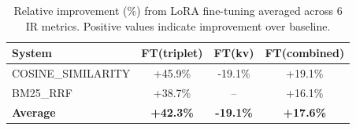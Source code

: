 \begin{table}[htbp]
\centering
\caption{Relative improvement (\%) from LoRA fine-tuning averaged across 6 IR metrics. Positive values indicate improvement over baseline.}
\label{tab:finetune-delta}
\small
\begin{tabular}{lccc}
\toprule
\textbf{System} & \textbf{FT(triplet)} & \textbf{FT(kv)} & \textbf{FT(combined)} \\
\midrule
COSINE\_SIMILARITY & +45.9\% & -19.1\% & +19.1\% \\
BM25\_RRF & +38.7\% & -- & +16.1\% \\
\midrule
\textbf{Average} & \textbf{+42.3\%} & \textbf{-19.1\%} & \textbf{+17.6\%} \\
\bottomrule
\end{tabular}
\end{table}
